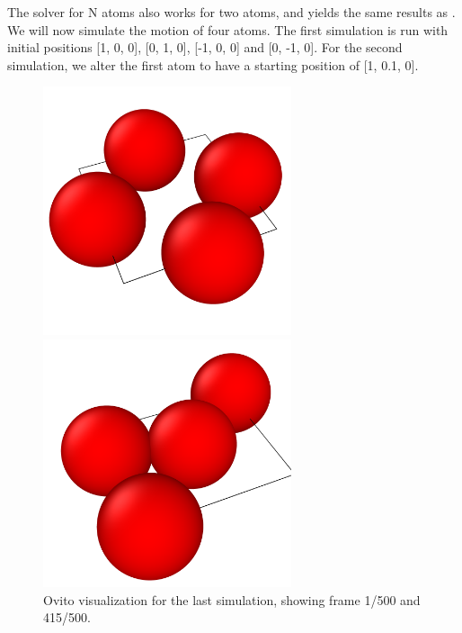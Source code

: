 \documentclass[a4paper,10pt,english]{article}
\begin{document}
The solver for N atoms also works for two atoms, and yields the same results as \textit{}. We will now simulate the motion of four atoms. The first simulation is run with initial positions [1, 0, 0], [0, 1, 0], [-1, 0, 0] and [0, -1, 0]. For the second simulation, we alter the first atom to have a starting position of [1, 0.1, 0].

\begin{figure}[h]
    \centering
    \begin{minipage}{0.5\textwidth}
        \centering
        \includegraphics[width=0.65\textwidth]{../figures/3_b_iii_1.png}
    \end{minipage}\hfill
    \begin{minipage}{0.5\textwidth}
        \centering
        \includegraphics[width=0.65\textwidth]{../figures/3_b_iii_2.png}
    \end{minipage}
    \caption{Ovito visualization for the last simulation, showing frame 1/500 and 415/500.}
    \label{fig:ovito2}
\end{figure}
\end{document}
